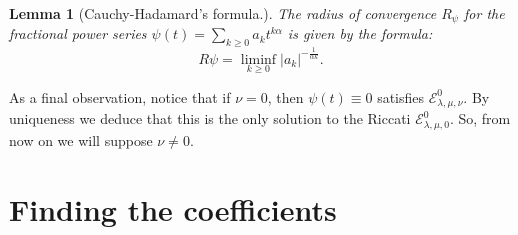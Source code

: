 \documentclass[a4paper,italian,11pt]{book}
\theoremstyle{plain}
\theoremstyle{remark}
\theoremstyle{plain}
\newtheorem{lemma}{Lemma}
\begin{document}
\begin{lemma}[Cauchy-Hadamard's formula.]
\label{lemma: cauchyHadamard}
\textit{The radius of convergence $R_\psi$ for the fractional power series $\psi(t) = \sum_{k\ge0} a_k t^{k\alpha}$ is given by the formula:}
\begin{equation}
    \label{eq: HadamardSformula}
    R\psi = \liminf_{k\ge 0} |a_k|^{-\frac{1}{\alpha k }}.
\end{equation}
\end{lemma}

\noindent
As a final observation, notice that if $\nu = 0$, then $\psi(t) \equiv 0$ satisfies $\mathcal{E}^0_{\lambda, \mu, \nu}$. 
By uniqueness we deduce that this is the only solution to the Riccati $\mathcal{E}^0_{\lambda, \mu, 0}$. So, from now on we will suppose $\nu \ne 0$.

\section{Finding the coefficients}
\end{document}
